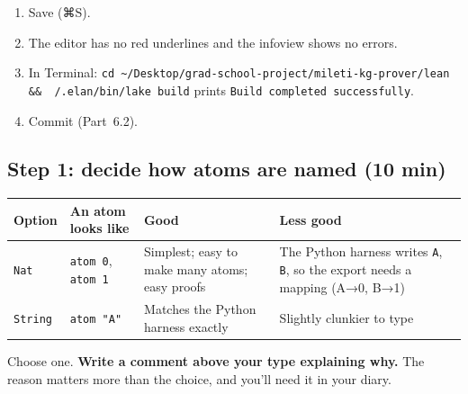 \documentclass[11pt,a4paper]{article}
\newcommand{\code}[1]{\texttt{#1}}
\begin{document}
\begin{okbox}
\begin{enumerate}
\item Save (⌘S).
\item The editor has no red underlines and the infoview shows no errors.
\item In Terminal: \code{cd \textasciitilde/Desktop/grad-school-project/mileti-kg-prover/lean \&\& ~/.elan/bin/lake build} prints \code{Build completed successfully}.
\item Commit (Part~6.2).
\end{enumerate}
\end{okbox}

\subsection{Step 1: decide how atoms are named (10 min)}
\begin{center}
\begin{tabularx}{\linewidth}{@{}l>{\raggedright\arraybackslash}X>{\raggedright\arraybackslash}X>{\raggedright\arraybackslash}X@{}}
\toprule
\textbf{Option} & \textbf{An atom looks like} & \textbf{Good} & \textbf{Less good}\\
\midrule
\code{Nat} & \code{atom 0}, \code{atom 1} & Simplest; easy to make many atoms; easy proofs & The Python harness writes \code{A}, \code{B}, so the export needs a mapping (A→0, B→1)\\
\code{String} & \code{atom "A"} & Matches the Python harness exactly & Slightly clunkier to type\\
\bottomrule
\end{tabularx}
\end{center}
Choose one. \textbf{Write a comment above your type explaining why.} The reason matters more than the choice, and you'll need it in your diary.
\end{document}
